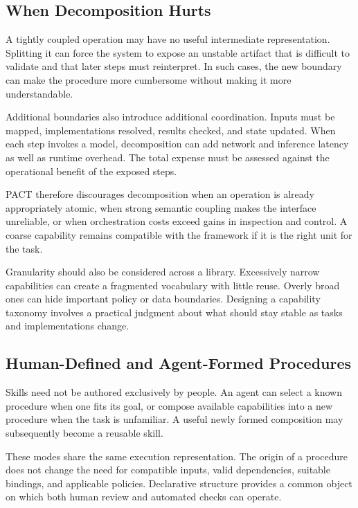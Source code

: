 \documentclass[10pt,twocolumn,a4paper]{article}
\begin{document}
\subsection{When Decomposition Hurts}

A tightly coupled operation may have no useful intermediate representation. Splitting it can force the system to expose an unstable artifact that is difficult to validate and that later steps must reinterpret. In such cases, the new boundary can make the procedure more cumbersome without making it more understandable.


Additional boundaries also introduce additional coordination. Inputs must be mapped, implementations resolved, results checked, and state updated. When each step invokes a model, decomposition can add network and inference latency as well as runtime overhead. The total expense must be assessed against the operational benefit of the exposed steps.


PACT therefore discourages decomposition when an operation is already appropriately atomic, when strong semantic coupling makes the interface unreliable, or when orchestration costs exceed gains in inspection and control. A coarse capability remains compatible with the framework if it is the right unit for the task.


Granularity should also be considered across a library. Excessively narrow capabilities can create a fragmented vocabulary with little reuse. Overly broad ones can hide important policy or data boundaries. Designing a capability taxonomy involves a practical judgment about what should stay stable as tasks and implementations change.


\subsection{Human-Defined and Agent-Formed Procedures}

Skills need not be authored exclusively by people. An agent can select a known procedure when one fits its goal, or compose available capabilities into a new procedure when the task is unfamiliar. A useful newly formed composition may subsequently become a reusable skill.


These modes share the same execution representation. The origin of a procedure does not change the need for compatible inputs, valid dependencies, suitable bindings, and applicable policies. Declarative structure provides a common object on which both human review and automated checks can operate.
\end{document}
